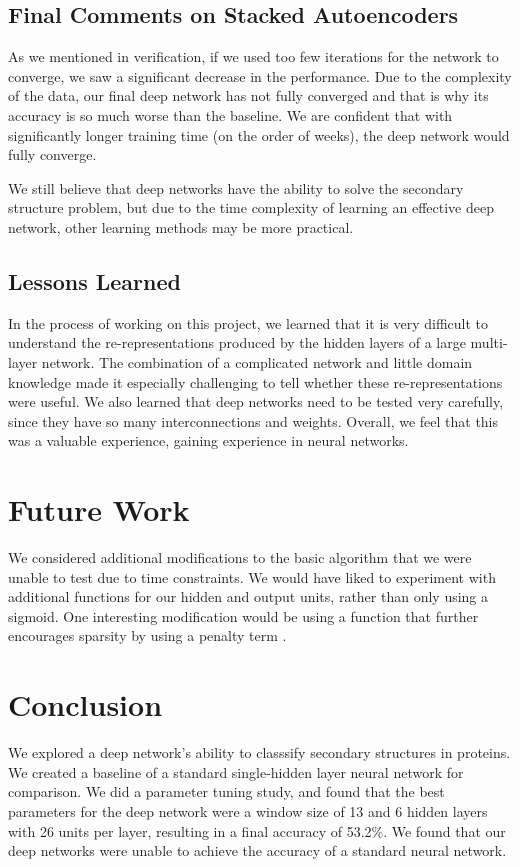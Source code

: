 \documentclass[letterpaper,twocolumn,12pt]{article}
\begin{document}
\subsection{Final Comments on Stacked Autoencoders}
As we mentioned in verification, if we used too few iterations for the network to converge, we saw a significant decrease in the performance.
Due to the complexity of the data, our final deep network has not fully converged and that is why its accuracy is so much worse than the baseline.
We are confident that with significantly longer training time (on the order of weeks), the deep network would fully converge.

We still believe that deep networks have the ability to solve the secondary structure problem, but due to the time complexity of learning an effective deep network, other learning methods may be more practical.

\subsection{Lessons Learned}
In the process of working on this project, we learned that it is very difficult to understand the re-representations produced by the hidden layers of a large multi-layer network.
The combination of a complicated network and little domain knowledge made it especially challenging to tell whether these re-representations were useful.
We also learned that deep networks need to be tested very carefully, since they have so many interconnections and weights.
Overall, we feel that this was a valuable experience, gaining experience in neural networks.

\section{Future Work}
We considered additional modifications to the basic algorithm that we were unable to test due to time constraints.
We would have liked to experiment with additional functions for our hidden and output units, rather than only using a sigmoid.
One interesting modification would be using a function that further encourages sparsity by using a penalty term \cite{ng}.

\section{Conclusion}
We explored a deep network's ability to classsify secondary structures in proteins.
We created a baseline of a standard single-hidden layer neural network for comparison.
We did a parameter tuning study, and found that the best parameters for the deep network were a window size of 13 and 6 hidden layers with 26 units per layer, resulting in a final accuracy of 53.2\%.
We found that our deep networks were unable to achieve the accuracy of a standard neural network.
\end{document}
